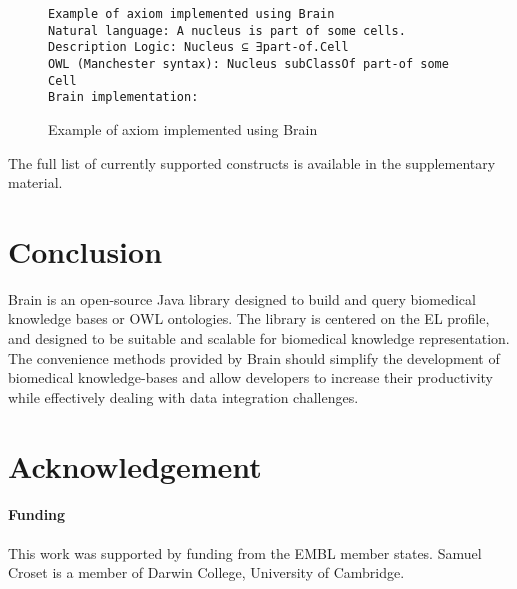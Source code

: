 \documentclass{bioinfo}
\begin{document}
\begin{figure}[h]
\begin{verbatim}
Example of axiom implemented using Brain
Natural language: A nucleus is part of some cells.
Description Logic: Nucleus ⊆ ∃part-of.Cell
OWL (Manchester syntax): Nucleus subClassOf part-of some Cell
Brain implementation:
\end{verbatim}
\caption{Example of axiom implemented using Brain}
\end{figure}

The full list of currently supported constructs is available in the supplementary material.


\section{Conclusion}
Brain is an open-source Java library designed to build and query biomedical knowledge bases or OWL ontologies.
The library is centered on the EL profile, and designed to be suitable and scalable for biomedical knowledge representation.
The convenience methods provided by Brain should simplify the development of biomedical knowledge-bases and allow developers
to increase their productivity while effectively dealing with data integration challenges.

\section*{Acknowledgement}
\paragraph{Funding\textcolon}
This work was supported by funding from the EMBL member states. Samuel Croset is a member of Darwin College, University of Cambridge.

% 
% 
% 
% 
% 
% 
% 
% 
% 
\end{document}

